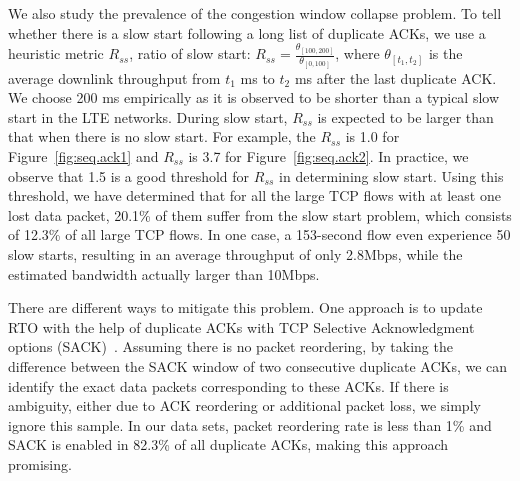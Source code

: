 We also study the prevalence of the congestion window collapse problem. To tell whether there is a slow start following a long list of duplicate ACKs, we use a heuristic metric $R_{ss}$, ratio of slow start:
$R_{ss} = \frac{\theta_{[100, 200]}}{\theta_{[0, 100]}}$,
where $\theta_{[t_{1}, t_{2}]}$ is the average downlink throughput from $t_{1}$ ms to $t_{2}$ ms after the last duplicate ACK. We choose 200 ms empirically as it is observed to be shorter than a typical slow start in the LTE networks. During slow start, $R_{ss}$ is expected to be larger than that when there is no slow start. For example, the $R_{ss}$ is 1.0 for Figure~\ref{fig:seq.ack1} and $R_{ss}$ is 3.7 for Figure~\ref{fig:seq.ack2}. In practice, we observe that 1.5 is a good threshold for $R_{ss}$ in determining slow start. Using this threshold, we have determined that for all the large TCP flows with at least one lost data packet, 20.1\% of them suffer from the slow start problem, which consists of 12.3\% of all large TCP flows. In one case, a 153-second flow even experience 50 slow starts, resulting in an average throughput of only 2.8Mbps, while the estimated bandwidth actually larger than 10Mbps.

There are different ways to mitigate this problem. One approach is to update RTO with the help of duplicate ACKs with TCP Selective Acknowledgment options (SACK)~\cite{rfc2018}. Assuming there is no packet reordering, by taking the difference between the SACK window of two consecutive duplicate ACKs, we can identify the exact data packets corresponding to these ACKs. If there is ambiguity, either due to ACK reordering or additional packet loss, we simply ignore this sample. In our data sets, packet reordering rate is less than 1\% and SACK is enabled in 82.3\% of all duplicate ACKs, making this approach promising.

